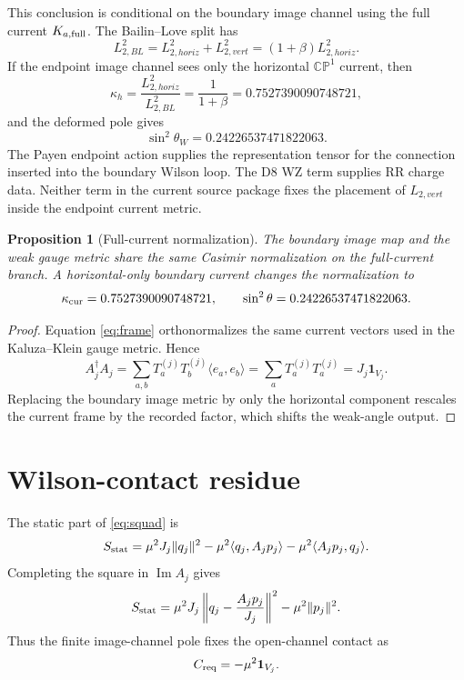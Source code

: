 \documentclass[11pt]{article}
\newcommand{\CP}{\mathbb{CP}}
\newcommand{\Imop}{\operatorname{Im}}
\theoremstyle{plain}
\newtheorem{proposition}{Proposition}[section]
\theoremstyle{definition}
\begin{document}
This conclusion is conditional on the boundary image channel using the full
current \(K_{a,\rm full}\).  The Bailin--Love split has
\begin{equation}
  L_{2,BL}^2=L_{2,horiz}^2+L_{2,vert}^2
  =(1+\beta)L_{2,horiz}^2 .
  \label{eq:blsplit}
\end{equation}
If the endpoint image channel sees only the horizontal \(\CP^1\) current, then
\begin{equation}
  \kappa_h=\frac{L_{2,horiz}^2}{L_{2,BL}^2}
  =\frac{1}{1+\beta}=0.7527390090748721,
  \label{eq:kappah}
\end{equation}
and the deformed pole gives
\begin{equation}
  \sin^2\theta_W=0.24226537471822063.
\end{equation}
The Payen endpoint action supplies the representation tensor for the
connection inserted into the boundary Wilson loop.  The D8 WZ term supplies RR
charge data.  Neither term in the current source package fixes the placement
of \(L_{2,vert}\) inside the endpoint current metric.

\begin{proposition}[Full-current normalization]
The boundary image map and the weak gauge metric share the same Casimir
normalization on the full-current branch.  A horizontal-only boundary current
changes the normalization to
\[
  \kappa_{\rm cur}=0.7527390090748721,
  \qquad
  \sin^2\theta=0.24226537471822063.
\]
\end{proposition}

\begin{proof}
Equation \eqref{eq:frame} orthonormalizes the same current vectors used in the
Kaluza--Klein gauge metric.  Hence
\[
  A_j^\dagger A_j
  =\sum_{a,b}T_a^{(j)}T_b^{(j)}\langle e_a,e_b\rangle
  =\sum_aT_a^{(j)}T_a^{(j)}
  =J_j\mathbf 1_{V_j}.
\]
Replacing the boundary image metric by only the horizontal component rescales
the current frame by the recorded factor, which shifts the weak-angle output.
\end{proof}

\section{Wilson-contact residue}

The static part of \eqref{eq:squad} is
\begin{equation}
  S_{\rm stat}
  =
  \mu^2J_j\|q_j\|^2
  -\mu^2\langle q_j,A_jp_j\rangle
  -\mu^2\langle A_jp_j,q_j\rangle .
  \label{eq:stat}
\end{equation}
Completing the square in \(\Imop A_j\) gives
\begin{equation}
  S_{\rm stat}
  =
  \mu^2J_j\left\|q_j-\frac{A_jp_j}{J_j}\right\|^2
  -\mu^2\|p_j\|^2.
  \label{eq:contact-fixed}
\end{equation}
Thus the finite image-channel pole fixes the open-channel contact as
\begin{equation}
  C_{\rm req}=-\mu^2\mathbf 1_{V_j}.
  \label{eq:creq}
\end{equation}
\end{document}

